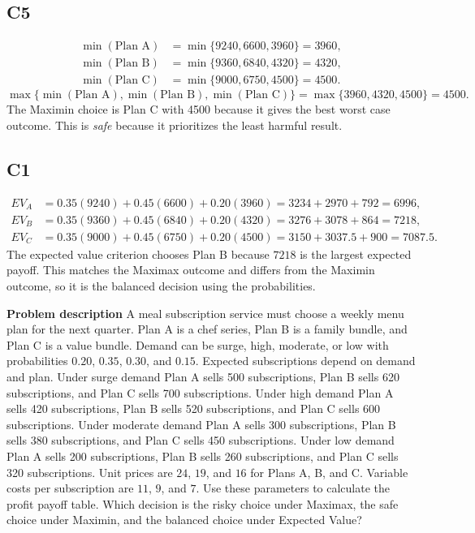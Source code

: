 \begin{ExamProblems}
		\subsection*{C5}
		\[
		\begin{aligned}
		\min(\text{Plan A}) &= \min\{9240,6600,3960\} = 3960,\\
		\min(\text{Plan B}) &= \min\{9360,6840,4320\} = 4320,\\
		\min(\text{Plan C}) &= \min\{9000,6750,4500\} = 4500.
		\end{aligned}
		\]
		\[
		\max\{\min(\text{Plan A}), \min(\text{Plan B}), \min(\text{Plan C})\}
		= \max\{3960, 4320, 4500\}
		= 4500.
		\]
		The Maximin choice is Plan C with 4500 because it gives the best worst case outcome. This is \emph{safe} because it prioritizes the least harmful result.

		\subsection*{C1}
		\[
		\begin{aligned}
		EV_A &= 0.35(9240)+0.45(6600)+0.20(3960)=3234+2970+792=6996,\\
		EV_B &= 0.35(9360)+0.45(6840)+0.20(4320)=3276+3078+864=7218,\\
		EV_C &= 0.35(9000)+0.45(6750)+0.20(4500)=3150+3037.5+900=7087.5.
		\end{aligned}
		\]
			The expected value criterion chooses Plan B because $7218$ is the largest expected payoff. This matches the Maximax outcome and differs from the Maximin outcome, so it is the balanced decision using the probabilities.
	
			\item
			\textbf{Problem description}
			A meal subscription service must choose a weekly menu plan for the next quarter. Plan A is a chef series, Plan B is a family bundle, and Plan C is a value bundle. Demand can be surge, high, moderate, or low with probabilities $0.20$, $0.35$, $0.30$, and $0.15$. Expected subscriptions depend on demand and plan. Under surge demand Plan A sells 500 subscriptions, Plan B sells 620 subscriptions, and Plan C sells 700 subscriptions. Under high demand Plan A sells 420 subscriptions, Plan B sells 520 subscriptions, and Plan C sells 600 subscriptions. Under moderate demand Plan A sells 300 subscriptions, Plan B sells 380 subscriptions, and Plan C sells 450 subscriptions. Under low demand Plan A sells 200 subscriptions, Plan B sells 260 subscriptions, and Plan C sells 320 subscriptions. Unit prices are $24$, $19$, and $16$ for Plans A, B, and C. Variable costs per subscription are $11$, $9$, and $7$. Use these parameters to calculate the profit payoff table. Which decision is the risky choice under Maximax, the safe choice under Maximin, and the balanced choice under Expected Value?
	

\end{ExamProblems}
